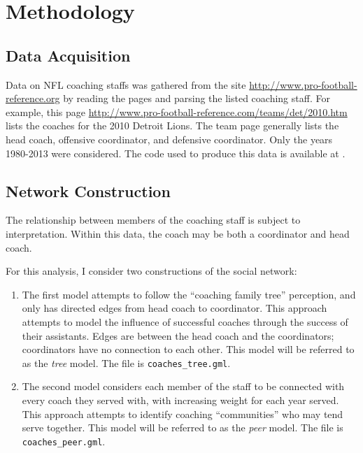 \documentclass[11pt]{article}\usepackage[]{graphicx}\usepackage[]{color}
\begin{document}
\section{Methodology}

\subsection{Data Acquisition}

Data on NFL coaching staffs was gathered from the site
\url{http://www.pro-football-reference.org} by reading the pages and parsing
the listed coaching staff.  For example, this page
\url{http://www.pro-football-reference.com/teams/det/2010.htm} lists the
coaches for the 2010 Detroit Lions.  The team page generally lists the head
coach, offensive coordinator, and defensive coordinator.  Only the years
1980-2013 were considered.  The code used to produce this data is available at \cite{scraper}.

\subsection{Network Construction}

The relationship between members of the coaching staff is subject to
interpretation.  Within this data, the coach may be both a coordinator and head
coach.  

For this analysis, I consider two constructions of the social network:
\begin{enumerate}

\item The first model attempts to follow the ``coaching family tree''
perception, and only has directed edges from head coach to coordinator.  This
approach attempts to model the influence of successful coaches through the
success of their assistants.  Edges are between the head coach and the
coordinators; coordinators have no connection to each other.  This model will
be referred to as the \emph{tree} model.  The file is {\tt coaches\_tree.gml}.

\item The second model considers each member of the staff to be connected with
every coach they served with, with increasing weight for each year served.
This approach attempts to identify coaching ``communities'' who may tend serve
together.  This model will be referred to as the \emph{peer} model.  The file
is {\tt coaches\_peer.gml}.

\end{enumerate}
\end{document}
